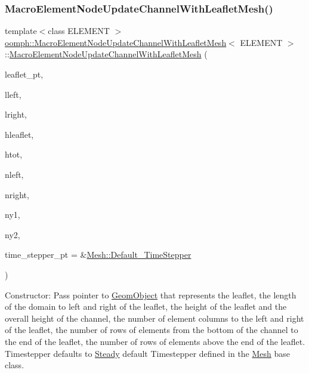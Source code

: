 \subsubsection{\texorpdfstring{Macro\+Element\+Node\+Update\+Channel\+With\+Leaflet\+Mesh()}{MacroElementNodeUpdateChannelWithLeafletMesh()}}
{\footnotesize\ttfamily template$<$class E\+L\+E\+M\+E\+NT $>$ \\
\hyperlink{classoomph_1_1MacroElementNodeUpdateChannelWithLeafletMesh}{oomph\+::\+Macro\+Element\+Node\+Update\+Channel\+With\+Leaflet\+Mesh}$<$ E\+L\+E\+M\+E\+NT $>$\+::\hyperlink{classoomph_1_1MacroElementNodeUpdateChannelWithLeafletMesh}{Macro\+Element\+Node\+Update\+Channel\+With\+Leaflet\+Mesh} (\begin{DoxyParamCaption}\item[{\hyperlink{classoomph_1_1GeomObject}{Geom\+Object} $\ast$}]{leaflet\+\_\+pt,  }\item[{const double \&}]{lleft,  }\item[{const double \&}]{lright,  }\item[{const double \&}]{hleaflet,  }\item[{const double \&}]{htot,  }\item[{const unsigned \&}]{nleft,  }\item[{const unsigned \&}]{nright,  }\item[{const unsigned \&}]{ny1,  }\item[{const unsigned \&}]{ny2,  }\item[{\hyperlink{classoomph_1_1TimeStepper}{Time\+Stepper} $\ast$}]{time\+\_\+stepper\+\_\+pt = {\ttfamily \&\hyperlink{classoomph_1_1Mesh_a12243d0fee2b1fcee729ee5a4777ea10}{Mesh\+::\+Default\+\_\+\+Time\+Stepper}} }\end{DoxyParamCaption})\hspace{0.3cm}{\ttfamily [inline]}}



Constructor\+: Pass pointer to \hyperlink{classoomph_1_1GeomObject}{Geom\+Object} that represents the leaflet, the length of the domain to left and right of the leaflet, the height of the leaflet and the overall height of the channel, the number of element columns to the left and right of the leaflet, the number of rows of elements from the bottom of the channel to the end of the leaflet, the number of rows of elements above the end of the leaflet. Timestepper defaults to \hyperlink{classoomph_1_1Steady}{Steady} default Timestepper defined in the \hyperlink{classoomph_1_1Mesh}{Mesh} base class. 



